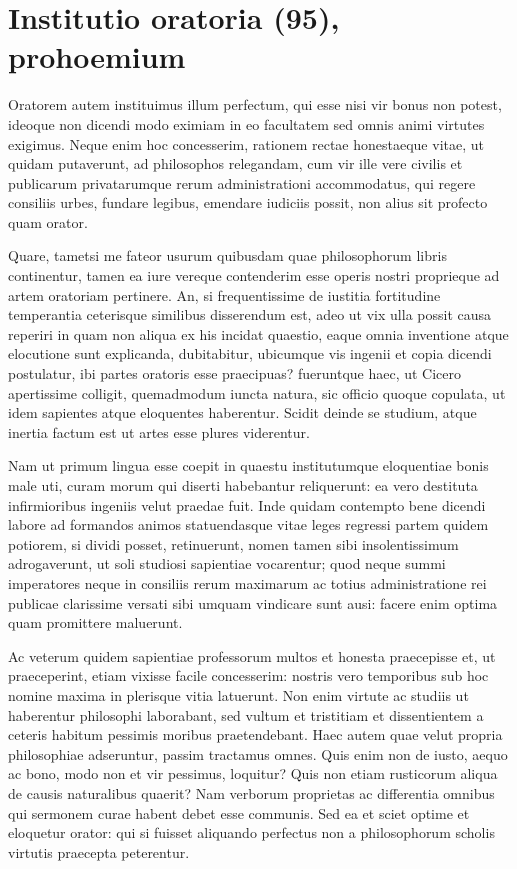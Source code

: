 
\section*{Institutio oratoria (95), prohoemium}

Oratorem autem instituimus illum perfectum, qui esse nisi vir bonus non potest, ideoque non dicendi modo eximiam in eo facultatem sed omnis animi virtutes exigimus. Neque enim hoc concesserim, rationem rectae honestaeque vitae, ut quidam putaverunt, ad philosophos relegandam, cum vir ille vere civilis et publicarum privatarumque rerum administrationi accommodatus, qui regere consiliis urbes, fundare legibus, emendare iudiciis possit, non alius sit profecto quam orator. 

Quare, tametsi me fateor usurum quibusdam quae philosophorum libris continentur, tamen ea iure vereque contenderim esse operis nostri proprieque ad artem oratoriam pertinere. An, si frequentissime de iustitia fortitudine temperantia ceterisque similibus disserendum est, adeo ut vix ulla possit causa reperiri in quam non aliqua ex his incidat quaestio, eaque omnia inventione atque elocutione sunt explicanda, dubitabitur, ubicumque vis ingenii et copia dicendi postulatur, ibi partes oratoris esse praecipuas? fueruntque haec, ut Cicero apertissime colligit, quemadmodum iuncta natura, sic officio quoque copulata, ut idem sapientes atque eloquentes haberentur. Scidit deinde se studium, atque inertia factum est ut artes esse plures viderentur. 

Nam ut primum lingua esse coepit in quaestu institutumque eloquentiae bonis male uti, curam morum qui diserti habebantur reliquerunt: ea vero destituta infirmioribus ingeniis velut praedae fuit. Inde quidam contempto bene dicendi labore ad formandos animos statuendasque vitae leges regressi partem quidem potiorem, si dividi posset, retinuerunt, nomen tamen sibi insolentissimum adrogaverunt, ut soli studiosi sapientiae vocarentur; quod neque summi imperatores neque in consiliis rerum maximarum ac totius administratione rei publicae clarissime versati sibi umquam vindicare sunt ausi: facere enim optima quam promittere maluerunt. 

Ac veterum quidem sapientiae professorum multos et honesta praecepisse et, ut praeceperint, etiam vixisse facile concesserim: nostris vero temporibus sub hoc nomine maxima in plerisque vitia latuerunt. Non enim virtute ac studiis ut haberentur philosophi laborabant, sed vultum et tristitiam et dissentientem a ceteris habitum pessimis moribus praetendebant. Haec autem quae velut propria philosophiae adseruntur, passim tractamus omnes. Quis enim non de iusto, aequo ac bono, modo non et vir pessimus, loquitur? Quis non etiam rusticorum aliqua de causis naturalibus quaerit? Nam verborum proprietas ac differentia omnibus qui sermonem curae habent debet esse communis. Sed ea et sciet optime et eloquetur orator: qui si fuisset aliquando perfectus non a philosophorum scholis virtutis praecepta peterentur. 

